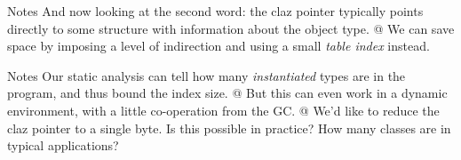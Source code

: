 \documentclass[%
pdf,
colorBG,
slideColor,
nototal,
oqe
]{prosper}
\newenvironment{talknotes}{\begin{slide}{Notes}\tiny}{\end{slide}}
\begin{document}

\begin{talknotes}
And now looking at the second word: the claz pointer typically points
directly to some structure with information about the object type.
@
We can save space by imposing a level of indirection and using
a small \emph{table index} instead.
\end{talknotes}


\begin{talknotes}
Our static analysis can tell how many \emph{instantiated} types are in
the program, and thus bound the index size.  @ But this can even work in
a dynamic environment, with a little co-operation from the GC.
@ We'd like to reduce the claz pointer to a single byte.  Is this
possible in practice?  How many classes are in typical applications?
\end{talknotes}
\end{document}
